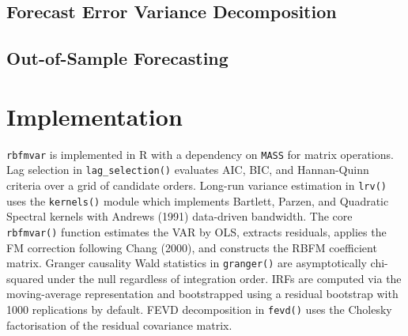 \subsection{Forecast Error Variance
Decomposition}\label{forecast-error-variance-decomposition}

\begin{Shaded}
\begin{Highlighting}[]
\OtherTok{\textless{}{-}}  \NormalTok{)}
\end{Highlighting}
\end{Shaded}

\subsection{Out-of-Sample Forecasting}\label{out-of-sample-forecasting}

\begin{Shaded}
\begin{Highlighting}[]
\OtherTok{\textless{}{-}}  \NormalTok{)}
\end{Highlighting}
\end{Shaded}

\section{Implementation}\label{implementation}

\texttt{rbfmvar} is implemented in R with a dependency on \texttt{MASS}
for matrix operations. Lag selection in \texttt{lag\_selection()}
evaluates AIC, BIC, and Hannan-Quinn criteria over a grid of candidate
orders. Long-run variance estimation in \texttt{lrv()} uses the
\texttt{kernels()} module which implements Bartlett, Parzen, and
Quadratic Spectral kernels with Andrews (1991) data-driven bandwidth.
The core \texttt{rbfmvar()} function estimates the VAR by OLS, extracts
residuals, applies the FM correction following Chang (2000), and
constructs the RBFM coefficient matrix. Granger causality Wald
statistics in \texttt{granger()} are asymptotically chi-squared under
the null regardless of integration order. IRFs are computed via the
moving-average representation and bootstrapped using a residual
bootstrap with 1000 replications by default. FEVD decomposition in
\texttt{fevd()} uses the Cholesky factorisation of the residual
covariance matrix.

